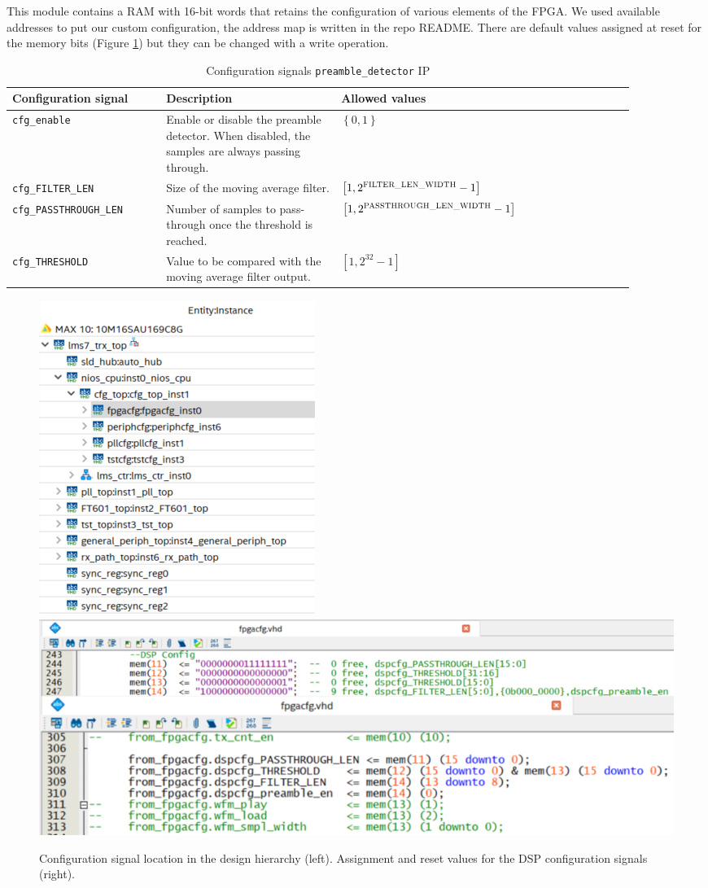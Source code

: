 This module contains a RAM with 16-bit words that retains the configuration of various elements of the FPGA. We used available addresses to put our custom configuration, the address map is written in the repo README. There are default values assigned at reset for the memory bits (Figure \ref{fig:design_hier_fpgacfg}) but they can be changed with a write operation.

\begin{table}[!h]
\centering
\begin{tabular}{|p{0.22\linewidth}|p{0.25\linewidth}|p{0.34\linewidth}|p{0.08\linewidth}|}
\hline
Configuration signal & Description & Allowed values\\
\hline
\texttt{cfg\_enable} & Enable or disable the preamble detector. When disabled, the samples are always passing through. & $\left\{0,1\right\}$ \\
\hline
\texttt{cfg\_FILTER\_LEN} & Size of the moving average filter. & $\left[1,2^{\textsc{FILTER\_LEN\_WIDTH}}-1\right]$ \\
\hline
\texttt{cfg\_PASSTHROUGH\_LEN} & Number of samples to pass-through once the threshold is reached. & $\left[1,2^{\textsc{PASSTHROUGH\_LEN\_WIDTH}}-1\right]$ \\
\hline
\texttt{cfg\_THRESHOLD} & Value to be compared with the moving average filter output. & $\left[1,2^{32}-1\right]$ \\
\hline
\end{tabular}
\caption{Configuration signals \texttt{preamble\_detector} IP}
\label{table:pd_soft_param}
\end{table}

\begin{figure}[!h]
    \centering
    \includegraphics[width=0.3\linewidth]{figures/design_hierarchy_fpgacfg.PNG}
    \includegraphics[width=0.6\linewidth]{figures/design_hierarchy_fpgacfg_both.PNG}
    \caption{Configuration signal location in the design hierarchy (left). Assignment and reset values for the DSP configuration signals (right).}
    \label{fig:design_hier_fpgacfg}
\end{figure}

